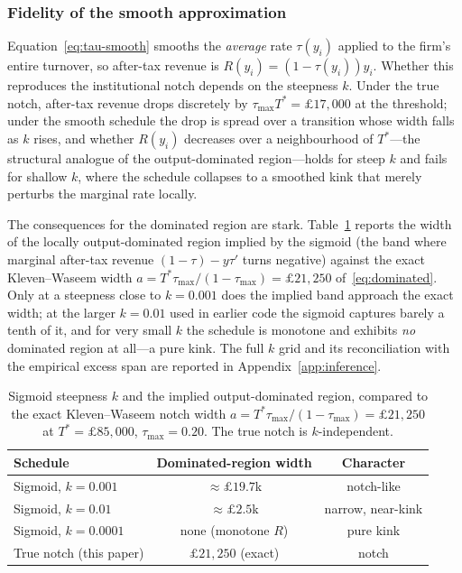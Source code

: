\subsubsection*{Fidelity of the smooth approximation}

Equation~\eqref{eq:tau-smooth} smooths the \emph{average} rate $\tau(y_i)$
applied to the firm's entire turnover, so after-tax revenue is
$R(y_i)=(1-\tau(y_i))y_i$. Whether this reproduces the institutional notch
depends on the steepness $k$. Under the true notch, after-tax revenue drops
discretely by $\tau_{\max}T^{*}=\pounds17{,}000$ at the threshold; under the
smooth schedule the drop is spread over a transition whose width falls as $k$
rises, and whether $R(y_i)$ decreases over a neighbourhood of $T^{*}$---the
structural analogue of the output-dominated region---holds for steep $k$ and
fails for shallow $k$, where the schedule collapses to a smoothed kink that
merely perturbs the marginal rate locally.

The consequences for the dominated region are stark.
Table~\ref{tab:notch-vs-sigmoid} reports the width of the locally
output-dominated region implied by the sigmoid (the band where marginal
after-tax revenue $(1-\tau)-y\tau'$ turns negative) against the exact
Kleven--Waseem width $a=T^{*}\tau_{\max}/(1-\tau_{\max})=\pounds21{,}250$
of~\eqref{eq:dominated}. Only at a steepness close to $k=0.001$ does the implied
band approach the exact width; at the larger $k=0.01$ used in earlier code the
sigmoid captures barely a tenth of it, and for very small $k$ the schedule is
monotone and exhibits \emph{no} dominated region at all---a pure kink. The full
$k$ grid and its reconciliation with the empirical excess span are reported in
Appendix~\ref{app:inference}.

\begin{table}[t]
  \centering
  \caption{Sigmoid steepness $k$ and the implied output-dominated region,
    compared to the exact Kleven--Waseem notch width
    $a=T^{*}\tau_{\max}/(1-\tau_{\max})=\pounds21{,}250$ at
    $T^{*}=\pounds85{,}000$, $\tau_{\max}=0.20$. The true notch is
    $k$-independent.}
  \label{tab:notch-vs-sigmoid}
  \begin{tabular}{lcc}
    \hline
    Schedule & Dominated-region width & Character \\
    \hline
    Sigmoid, $k=0.001$      & $\approx\pounds19.7$k     & notch-like \\
    Sigmoid, $k=0.01$       & $\approx\pounds2.5$k      & narrow, near-kink \\
    Sigmoid, $k=0.0001$     & none (monotone $R$)       & pure kink \\
    True notch (this paper) & $\pounds21{,}250$ (exact) & notch \\
    \hline
  \end{tabular}
\end{table}

